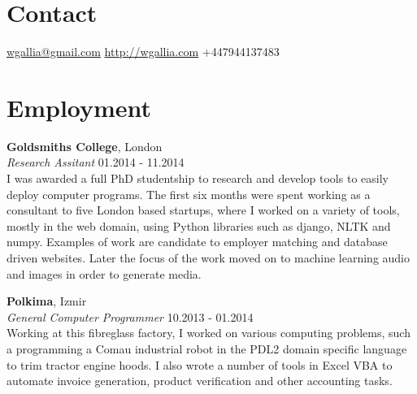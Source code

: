 \documentclass[margin,line,a4paper]{resume}
\begin{document}

\begin{resume}

\section{\mysidestyle Contact}

\hypersetup{urlcolor=Fuchsia}
\href{mailto:wgallia@gmail.com}{wgallia@gmail.com} \hfill
\hypersetup{urlcolor=RoyalBlue}
\href{http://wgallia.com}{http://wgallia.com} \hfill
+447944137483 \\


\section{\mysidestyle Employment}

\textbf{Goldsmiths College}, London \vspace{1mm}\\
\textsl{Research Assitant} \hfill 01.2014 - 11.2014 \vspace{2mm} \\
I was awarded a full PhD studentship to research and develop tools to
easily deploy computer programs. The first six months were spent working
as a consultant to five London based startups, where I worked on a
variety of tools, mostly in the web domain, using Python libraries
such as django, NLTK and numpy. Examples of work are candidate to
employer matching and database driven websites. Later the focus of the
work moved on to machine learning audio and images in order to
generate media.


\textbf{Polkima}, Izmir \vspace{1mm}\\
\textsl{General Computer Programmer} \hfill 10.2013 - 01.2014 \vspace{2mm} \\
Working at this fibreglass factory, I worked on various computing
problems, such a programming a Comau industrial robot in the PDL2
domain specific language to trim tractor engine hoods. I also wrote a
number of tools in Excel VBA to automate invoice generation, product
verification and other accounting tasks.


\end{resume}
\end{document}
